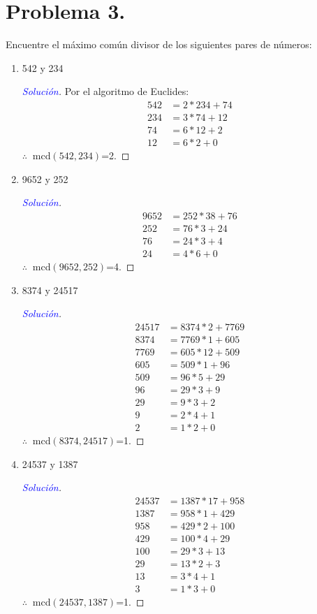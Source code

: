 \documentclass[a4paper,12pt]{article}
\newenvironment{solution}
  {\renewcommand\qedsymbol{$\square$}\begin{proof}[\textcolor{blue}{Solución}]}
  {\end{proof}}
\begin{document}
\section{Problema 3.} Encuentre el máximo común divisor de los siguientes pares de números:
\begin{enumerate}[label=\alph*.]
	\item 542 y 234
	\begin{solution}
	Por el algoritmo de Euclides: 
	\begin{align*}
		  542 &= 2*234+74   \\
		 234 &= 3*74+12\\
		 74 &= 6*12+2\\
		 12 &= 6*2+0
	\end{align*}
$\therefore \ $ mcd$(542,234)$=2. 
\end{solution}
	\item  9652 y 252
	\begin{solution}
		\begin{align*}
			 9652 &= 252*38 + 76\\
			252 &= 76*3 + 24\\
			76 &= 24*3 + 4\\
			24 &= 4*6 + 0
		\end{align*}
	$\therefore \ $ mcd$(9652,252)$=4. 
	\end{solution}
	\item 8374 y 24517
	\begin{solution}
		\begin{align*}
			 24517 &= 8374*2 + 7769\\
			8374 &= 7769*1 + 605\\
			7769 &= 605*12 + 509\\
			605 &= 509*1 + 96\\
			509 &= 96*5 + 29\\
			96 &= 29*3 + 9\\
			29 &= 9*3 + 2\\
			9 &= 2*4 + 1\\
			2 &= 1*2 + 0
		\end{align*}
		$\therefore \ $ mcd$(8374,24517)$=1. 
	\end{solution}
	\item 24537 y 1387
	\begin{solution}
		\begin{align*}
			 24537 &= 1387*17 + 958\\
			1387 &= 958*1 + 429\\
			958 &= 429*2 + 100\\
			429 &= 100*4 + 29\\
			100 &= 29*3 + 13\\
			29 &= 13*2 + 3\\
			13 &= 3*4 + 1\\
			3 &= 1*3 + 0
		\end{align*}
	$\therefore \ $ mcd$(24537,1387)$=1. 
	\end{solution}
\end{enumerate}
\end{document}
